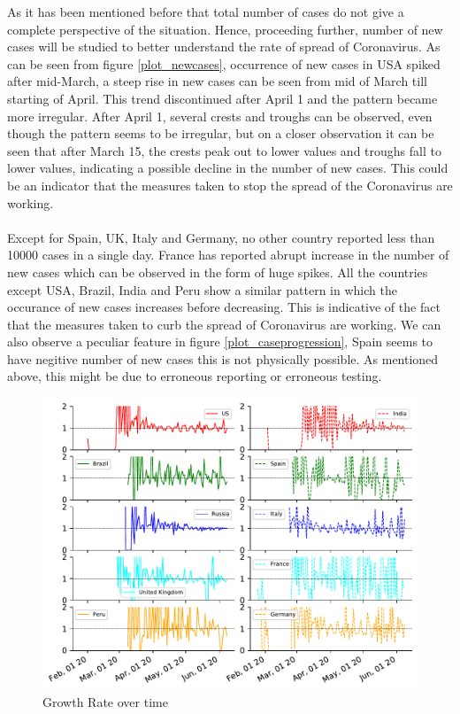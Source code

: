 \documentclass[12pt, twosided]{report}  %
\begin{document}
As it has been mentioned before that total number of cases do not give a complete perspective of the situation. Hence, proceeding further, number of new cases will be studied to better understand the rate of spread of Coronavirus. As can be seen from figure \ref{plot_newcases}, occurrence of new cases in USA spiked after mid-March, a steep rise in new cases can be seen from mid of March till starting of April. 
This trend discontinued after April 1 and the pattern became more irregular. After April 1, several crests and troughs can be observed, even though the pattern seems to be irregular, but on a closer observation it can be seen that after March 15, the crests peak out to lower values and troughs fall to lower values, indicating a possible decline in the number of new cases. This could be an indicator that the measures taken to stop the spread of the Coronavirus are working.
\\
\\
Except for Spain, UK, Italy and Germany, no other country reported less than 10000 cases in a single day. France has reported abrupt increase in the number of new cases which can be observed in the form of huge  spikes. All the countries except USA, Brazil, India and Peru show a similar pattern in which the occurance of new cases increases before decreasing. This is indicative of the fact that the measures taken to curb the spread of Coronavirus are working. We can also observe a peculiar feature in figure \ref{plot_caseprogression}, Spain seems to have negitive number of new cases this is not physically possible. As mentioned above, this might be due to erroneous reporting or erroneous testing.

\begin{figure}[H]
	\centering
	\includegraphics[width=0.5\linewidth]{./images/plot-6.pdf}
	\caption{Growth Rate over time}
	\label{plot_growthrate}
\end{figure}
\end{document}

